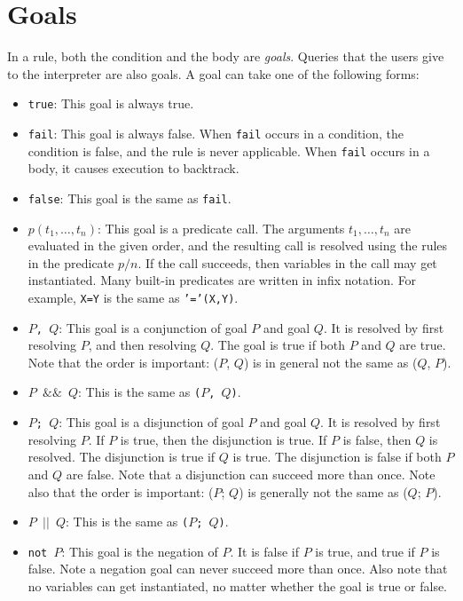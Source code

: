 \section{Goals}
In a rule, both the condition and the body are \emph{goals}. Queries that the users give to the interpreter are also goals. A goal can take one of the following forms:
\begin{itemize}
\item \texttt{true}: This goal is always true.
\item \texttt{fail}: This goal is always false. When \texttt{fail} occurs in a condition, the condition is false, and the rule is never applicable. When \texttt{fail} occurs in a body, it causes execution to backtrack.
\item \texttt{false}: This goal is the same as \texttt{fail}.
\item $p(t_1, \ldots, t_n)$: This goal is a predicate call. The arguments $t_1, \ldots, t_n$ are evaluated in the given order, and the resulting call is resolved using the rules in the predicate $p/n$. If the call succeeds, then variables in the call may get instantiated. Many built-in predicates are written in infix notation. For example, \texttt{X=Y} is the same as \texttt{'='(X,Y)}.
\item \texttt{$P$, $Q$}: This goal is a conjunction of goal $P$ and goal $Q$. It is resolved by first resolving $P$, and then resolving $Q$. The goal is true if both $P$ and $Q$ are true. Note that the order is important: ($P$, $Q$) is in general not the same as ($Q$, $P$).
\item \texttt{$P$ $\&\&$ $Q$}: This is the same as \texttt{($P$, $Q$)}. 
\item \texttt{$P$; $Q$}: This goal is a disjunction of goal $P$ and goal $Q$. It is resolved by first resolving $P$. If $P$ is true, then the disjunction is true. If $P$ is false, then $Q$ is resolved. The disjunction is true if $Q$ is true. The disjunction is false if both $P$ and $Q$ are false. Note that a disjunction can succeed more than once. Note also that the order is important: ($P$; $Q$) is generally not the same as ($Q$; $P$).
\item \texttt{$P$ $|$$|$ $Q$}: This is the same as \texttt{($P$; $Q$)}.
\item \texttt{not $P$}: This goal is the negation of $P$. It is false if $P$ is true, and true if $P$ is false.  Note a negation goal can never succeed more than once.  Also note that no variables can get instantiated, no matter whether the goal is true or false.

\end{itemize}
